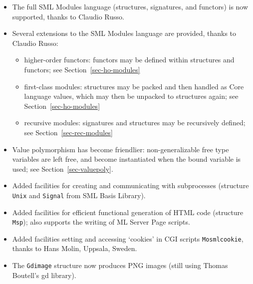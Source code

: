 \documentclass[fleqn]{article}
\begin{document}
\begin{itemize}
\item The full SML Modules language (structures, signatures, and
  functors) is now supported, thanks to Claudio Russo.
\item Several extensions to the SML Modules language are provided,
  thanks to Claudio Russo:
  \begin{itemize}
  \item higher-order functors: functors may be defined within
    structures and functors; see Section~\ref{sec-ho-modules}
  \item first-class modules: structures may be packed and then handled
    as Core language values, which may then be unpacked to structures
    again; see Section~\ref{sec-ho-modules}
  \item recursive modules: signatures and structures may be
    recursively defined; see Section~\ref{sec-rec-modules}
  \end{itemize}
\item Value polymorphism has become friendlier: non-generalizable free
  type variables are left free, and become instantiated when the bound
  variable is used; see Section~\ref{sec-valuepoly}.
\item Added facilities for creating and communicating with
  subprocesses (structure \texttt{Unix} and \texttt{Signal} from SML
  Basis Library).
\item Added facilities for efficient functional generation of HTML
  code (structure \texttt{Msp}); also supports the writing of ML
  Server Page scripts.
\item Added facilities setting and accessing `cookies' in CGI scripts
  \texttt{Mosmlcookie}, thanks to Hans Molin, Uppsala, Sweden.
\item The \texttt{Gdimage} structure now produces PNG images (still
  using Thomas Boutell's gd library).
\end{itemize}


  
\end{document}
